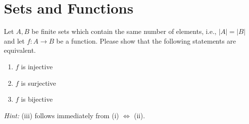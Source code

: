 \section{Sets and Functions}
Let $A, B$ be finite sets which contain the same number of elements, i.e., $|A| = |B|$ and let $f: A \rightarrow B$ be a function. Please show that
	the following statements are equivalent.
	\begin{enumerate}
		\item $f$ is injective
		\item $f$ is surjective
		\item $f$ is bijective
	\end{enumerate}
		\textit{Hint:} (iii) follows immediately from (i) $\Leftrightarrow$ (ii).